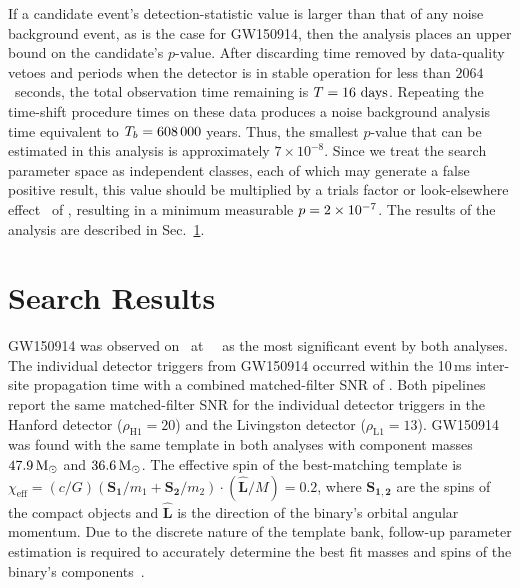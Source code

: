 If a candidate event's detection-statistic value is larger than that of any
noise background event, as is the case for GW150914, then the \pycbc{}
analysis places an upper bound on the candidate's $p$-value.
After discarding time removed by data-quality vetoes and periods when the
detector is in stable operation for less than $2064$~seconds, the total
observation time remaining is $T= 16~\mathrm{days}$.  Repeating the time-shift
procedure {\PYCBCHOWMANYTIMESLIDES} times on these data produces a noise
background analysis time equivalent to $T_b=608\,000$ years.  Thus,
the smallest $p$-value that can be estimated in this analysis is
approximately $7\times 10^{-8}$. Since we treat the search parameter
space as \PYCBCTRIALFACTOR{} independent classes, each of which may generate a
false positive result, this value should be multiplied by a trials factor or
look-elsewhere effect~\cite{Lyons:1900zz} of \PYCBCTRIALFACTOR{}, resulting in
a minimum measurable $p = 2\times 10^{-7}$.  The
results of the \pycbc{} analysis are described in Sec.~\ref{s:results}.

\section{Search Results}
\label{s:results}

GW150914 was observed on \OBSEVENTDATEMONTHDAYYEAR\ at \OBSEVENTTIME
~\OBSEVENTTZ\ as the most significant event by both analyses. The individual
detector triggers from GW150914 occurred within the 10\,ms inter-site
propagation time with a combined matched-filter SNR of
\OBSEVENTAPPROXCOMBINEDSNR. Both pipelines report the same matched-filter SNR
for the individual detector triggers in the Hanford detector
($\rho_\textrm{H1} = 20$) and the Livingston detector ($\rho_\textrm{L1} =
13$).  GW150914 was found with the same template in both analyses with
component masses $47.9\,\mathrm{M}_\odot$ and
$36.6\,\mathrm{M}_\odot$. The effective spin of the best-matching
template is $\chi_{\text{eff}} = (c/G) (\mathbf{S_1}/m_1 + \mathbf{S_2}/m_2)
\cdot (\mathbf{\hat{L}}/M) = 0.2$, where $\mathbf{S_{1,2}}$ are the spins of
the compact objects and $\mathbf{\hat{L}}$ is the direction of the binary's
orbital angular momentum. Due to the discrete nature of the template bank,
follow-up parameter estimation is required to accurately determine the best
fit masses and spins of the binary's components~\cite{Veitch:2014wba,
GW150914-PARAMESTIM}. 

